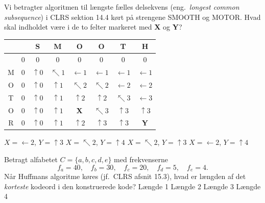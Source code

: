 Vi betragter algoritmen til længste fælles delsekvens (eng.~\emph{longest common subsequence}) i CLRS sektion 14.4 kørt på strengene SMOOTH og MOTOR.
Hvad skal indholdet være i de to felter markeret med {\bf X} og {\bf Y}?

\begin{center}
\begin{tabular}{c|c|c|c|c|c|c|c||}
    &   & S & M & O & O & T & H\\
    \hline
     & 0 & 0 & 0 & 0 & 0 & 0 & 0\\
     \hline
    M & 0 & $\uparrow0$ & $\nwarrow1$ & $\leftarrow1$ & $\leftarrow1$ & $\leftarrow1$ & $\leftarrow1$ \\
    O & 0 & $\uparrow0$ & $\uparrow1$ & $\nwarrow2$ & $\nwarrow2$ & $\leftarrow2$ & $\leftarrow2$ \\
    T & 0 & $\uparrow0$ & $\uparrow1$ & $\uparrow2$ & $\uparrow2$ & $\nwarrow3$ & $\leftarrow3$ \\
    O & 0 & $\uparrow0$ & $\uparrow1$ & {\bf X} & $\nwarrow3$ & $\uparrow3$ & $\uparrow3$ \\
    R & 0 & $\uparrow0$ & $\uparrow1$ & $\uparrow2$ & $\uparrow3$ & $\uparrow3$ & {\bf Y} \\
    \hline
\end{tabular}
\end{center}

\etsvar
\mulighederstart
\svar $X = \leftarrow2$, $Y = \uparrow3$
\svar $X = \nwarrow2$, $Y = \uparrow4$
\svar $X = \nwarrow2$, $Y = \uparrow3$ \korrekt
\svar $X = \leftarrow2$, $Y = \uparrow4$
\mulighederslut
{}

Betragt alfabetet \(C=\{a,b,c,d,e\}\) med frekvenserne
\[
f_a=40,\quad f_b=30,\quad f_c=20,\quad f_d=5,\quad f_e=4.
\]
Når Huffmans algoritme køres (jf.~CLRS afsnit 15.3), hvad er længden af det \emph{korteste} kodeord i den konstruerede kode?
\etsvar
\mulighederstart
\svar Længde 1\korrekt
\svar Længde 2
\svar Længde 3
\svar Længde 4
\mulighederslut
{}

